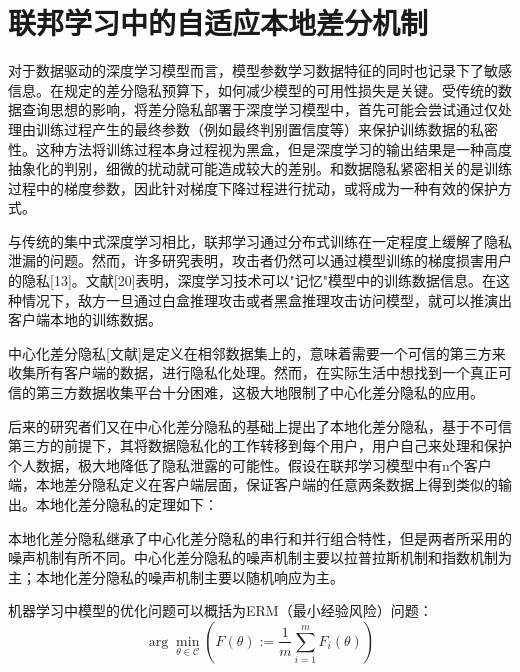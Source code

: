 \chapter{联邦学习中的自适应本地差分机制}

\label{ch3}
对于数据驱动的深度学习模型而言，模型参数学习数据特征的同时也记录下了敏感信息。在规定的差分隐私预算下，如何减少模型的可用性损失是关键。受传统的数据查询思想的影响，将差分隐私部署于深度学习模型中，首先可能会尝试通过仅处理由训练过程产生的最终参数（例如最终判别置信度等）来保护训练数据的私密性。这种方法将训练过程本身过程视为黑盒，但是深度学习的输出结果是一种高度抽象化的判别，细微的扰动就可能造成较大的差别。和数据隐私紧密相关的是训练过程中的梯度参数，因此针对梯度下降过程进行扰动，或将成为一种有效的保护方式。 

与传统的集中式深度学习相比，联邦学习通过分布式训练在一定程度上缓解了隐私泄漏的问题。然而，许多研究表明，攻击者仍然可以通过模型训练的梯度损害用户的隐私[13]。文献[20]表明，深度学习技术可以"记忆"模型中的训练数据信息。在这种情况下，敌方一旦通过白盒推理攻击或者黑盒推理攻击访问模型，就可以推演出客户端本地的训练数据。

中心化差分隐私[文献]是定义在相邻数据集上的，意味着需要一个可信的第三方来收集所有客户端的数据，进行隐私化处理。然而，在实际生活中想找到一个真正可信的第三方数据收集平台十分困难，这极大地限制了中心化差分隐私的应用。

后来的研究者们又在中心化差分隐私的基础上提出了本地化差分隐私，基于不可信第三方的前提下，其将数据隐私化的工作转移到每个用户，用户自己来处理和保护个人数据，极大地降低了隐私泄露的可能性。假设在联邦学习模型中有n个客户端，本地差分隐私定义在客户端层面，保证客户端的任意两条数据上得到类似的输出。本地化差分隐私的定理如下：
\begin{equation}\label{eq:本地差分隐私}

\end{equation}

本地化差分隐私继承了中心化差分隐私的串行和并行组合特性，但是两者所采用的噪声机制有所不同。中心化差分隐私的噪声机制主要以拉普拉斯机制和指数机制为主；本地化差分隐私的噪声机制主要以随机响应为主。

机器学习中模型的优化问题可以概括为ERM（最小经验风险）问题：
\begin{equation}\label{eq:ERM}
\arg \min _{\theta \in \mathcal{C}}\left(F(\theta):=\frac{1}{m} \sum_{i=1}^{m} F_{i}(\theta)\right)
\end{equation}

